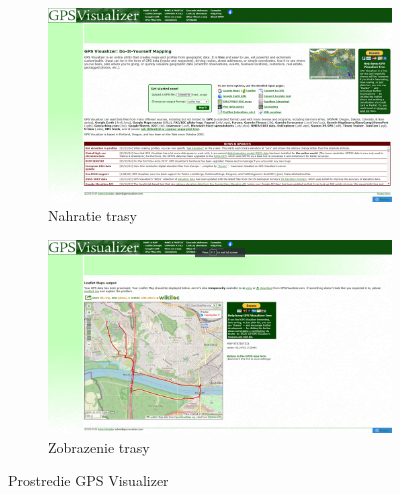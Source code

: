 \begin{figure}[H]
  \centering
  \begin{subfigure}{.7\textwidth}
    \centering
    \includegraphics[width=1\textwidth]{img/gps_visualizer/gpsvisualizer1.png}
    \caption{Nahratie trasy}
  \end{subfigure}
  \begin{subfigure}{.7\textwidth}
    \centering
    \includegraphics[width=1\textwidth]{img/gps_visualizer/gpsvisualizer2.png}
    \caption{Zobrazenie trasy}
  \end{subfigure}
  \caption{Prostredie GPS Visualizer}
  \label{fig:gps-visualizer}
\end{figure}

